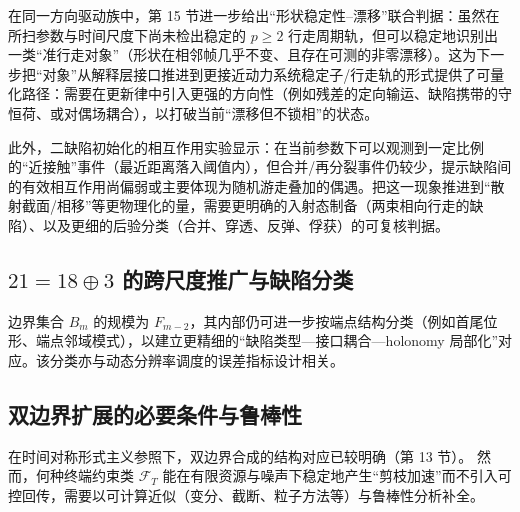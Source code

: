 在同一方向驱动族中，第 15 节进一步给出“形状稳定性--漂移”联合判据：虽然在所扫参数与时间尺度下尚未检出稳定的 $p\ge 2$ 行走周期轨，但可以稳定地识别出一类“准行走对象”（形状在相邻帧几乎不变、且存在可测的非零漂移）。这为下一步把“对象”从解释层接口推进到更接近动力系统稳定子/行走轨的形式提供了可量化路径：需要在更新律中引入更强的方向性（例如残差的定向输运、缺陷携带的守恒荷、或对偶场耦合），以打破当前“漂移但不锁相”的状态。

此外，二缺陷初始化的相互作用实验显示：在当前参数下可以观测到一定比例的“近接触”事件（最近距离落入阈值内），但合并/再分裂事件仍较少，提示缺陷间的有效相互作用尚偏弱或主要体现为随机游走叠加的偶遇。把这一现象推进到“散射截面/相移”等更物理化的量，需要更明确的入射态制备（两束相向行走的缺陷）、以及更细的后验分类（合并、穿透、反弹、俘获）的可复核判据。

\subsection{\texorpdfstring{$21=18\oplus 3$ 的跨尺度推广与缺陷分类}{21=18 oplus 3 的跨尺度推广与缺陷分类}}

边界集合 $B_m$ 的规模为 $F_{m-2}$，其内部仍可进一步按端点结构分类（例如首尾位形、端点邻域模式），以建立更精细的“缺陷类型—接口耦合—holonomy 局部化”对应。该分类亦与动态分辨率调度的误差指标设计相关。

\subsection{双边界扩展的必要条件与鲁棒性}

在时间对称形式主义参照下，双边界合成的结构对应已较明确（第 13 节）。\cite{cramer_transactional_1986}
然而，何种终端约束类 $\mathcal F_T$ 能在有限资源与噪声下稳定地产生“剪枝加速”而不引入可控回传，需要以可计算近似（变分、截断、粒子方法等）与鲁棒性分析补全。
